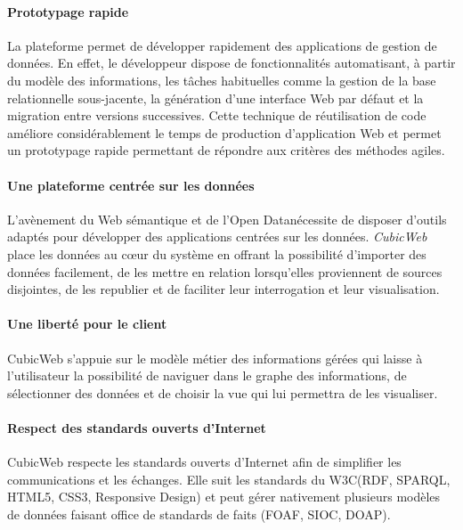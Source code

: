 \documentclass {report}
\begin{document}
\paragraph{Prototypage rapide}
La plateforme permet de développer rapidement des applications de gestion de données. En effet, le développeur dispose de fonctionnalités automatisant, à partir du modèle des informations, les tâches habituelles comme la gestion de la base relationnelle sous-jacente, la génération d'une interface Web par défaut et la migration entre versions successives. Cette technique de réutilisation de code améliore considérablement le temps de production d'application Web et permet un prototypage rapide permettant de répondre aux critères des méthodes agiles.

\paragraph{Une plateforme centrée sur les données}
L'avènement du Web sémantique et de l'Open Data\footnotemark[2] nécessite de disposer d'outils adaptés pour développer des applications centrées sur les données. \textit{CubicWeb} place les données au cœur du système en offrant la possibilité d'importer des données facilement, de les mettre en relation lorsqu'elles proviennent de sources disjointes, de les republier et de faciliter leur interrogation et leur visualisation. 


\paragraph{Une liberté pour le client}
CubicWeb s'appuie sur le modèle métier des informations gérées qui laisse à l'utilisateur la possibilité de naviguer dans le graphe des informations, de sélectionner des données et de choisir la vue qui lui permettra de les visualiser.





\paragraph{Respect des standards ouverts d'Internet}
CubicWeb respecte les standards ouverts d'Internet afin de simplifier les communications et les échanges. Elle suit les standards du W3C\footnotemark[1] (RDF\footnotemark[2], SPARQL\footnotemark[3], HTML5\footnotemark[4], CSS3\footnotemark[5], Responsive Design\footnotemark[6]) et peut gérer nativement plusieurs modèles de données faisant office de standards de faits (FOAF\footnotemark[7], SIOC\footnotemark[8], DOAP\footnotemark[9]).
\end{document}
